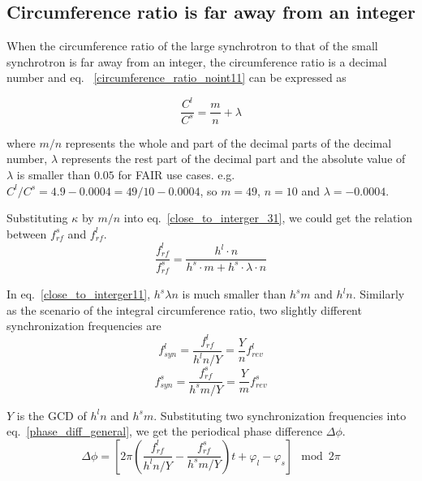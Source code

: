 \subsection{Circumference ratio is far away from an integer}
When the circumference ratio of the large synchrotron to that of the small synchrotron is far away from an integer, the circumference ratio is a decimal number and eq. ~\ref{circumference_ratio_noint11} can be expressed as

\begin{equation}
\frac{C^l}{C^s}=\frac{m}{n}+ \lambda \label{circumference_ratio_noint11}
\end{equation}

where $m/n$ represents the whole and part of the decimal parts of the decimal number, $\lambda$ represents the rest part of the decimal part and the absolute value of $\lambda$ is smaller than $0.05$ for FAIR use cases. e.g. $C^l/C^s=4.9-0.0004=49/10-0.0004$, so $m=49$, $n=10$ and $\lambda=-0.0004$. 

Substituting $\kappa$ by $m/n$ into eq.~\ref{close_to_interger_31}, we could get the relation between $f_{\mathit{rf}}^{s}$ and $f_{\mathit{rf}}^{l}$.
\begin{equation} 
\frac{f_{\mathit{rf}}^{l}}{f_{\mathit{rf}}^{s}}=\frac{h^l\cdot n}{h^s \cdot m+ h^s \cdot\lambda\cdot n}\label{close_to_interger11}
\end{equation}

In eq.~\ref{close_to_interger11}, $h^s\lambda n $ is much smaller than $h^s m$ and $h^l n$. Similarly as the scenario of the integral circumference ratio, two slightly different synchronization frequencies are 
\begin{equation}
f_{\mathit{syn}}^{l}=\frac{f_{\mathit{rf}}^{l}}{h^{l}n/Y}=\frac{Y}{n}f_{\mathit{rev}}^{l} \label{synch_freq111}
\end{equation}
\begin{equation}
f_{\mathit{syn}}^{s}=\frac{f_{\mathit{rf}}^{s}}{h^{s}m/Y}=\frac{Y}{m}f_{\mathit{rev}}^{s} \label{synch_freq222}
\end{equation}

$Y$ is the GCD of $h^l n$ and $h^s m$. Substituting two synchronization frequencies into eq.~\ref{phase_diff_general}, we get the periodical phase difference $\Delta \phi$.
\begin{equation}
	\Delta \phi=[2\pi(\frac{f_{\mathit{rf}}^{l}}{h^{l}n/Y}-\frac{f_{\mathit{rf}}^{s}}{h^{s}m/Y})t+\varphi_l-\varphi_s] \mod 2\pi \label{phase_diff_general11}
\end{equation}


